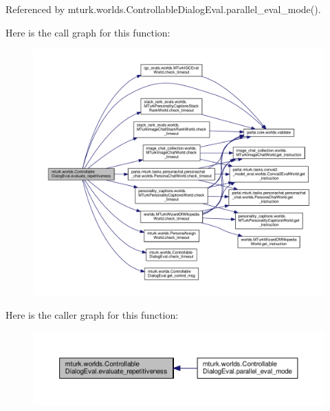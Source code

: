 Referenced by mturk.\+worlds.\+Controllable\+Dialog\+Eval.\+parallel\+\_\+eval\+\_\+mode().

Here is the call graph for this function\+:
\nopagebreak
\begin{figure}[H]
\begin{center}
\leavevmode
\includegraphics[width=350pt]{classmturk_1_1worlds_1_1ControllableDialogEval_a06569ce7ce50e5bc930bf699c4a70167_cgraph}
\end{center}
\end{figure}
Here is the caller graph for this function\+:
\nopagebreak
\begin{figure}[H]
\begin{center}
\leavevmode
\includegraphics[width=350pt]{classmturk_1_1worlds_1_1ControllableDialogEval_a06569ce7ce50e5bc930bf699c4a70167_icgraph}
\end{center}
\end{figure}
\mbox{\label{classmturk_1_1worlds_1_1ControllableDialogEval_ae1d1a4dcf645ea5776c7a7611f7ce386}} 

